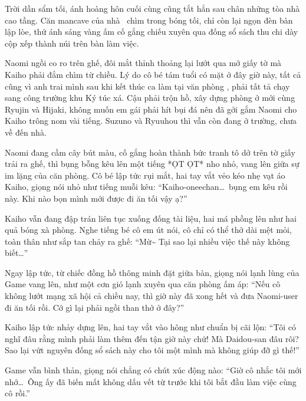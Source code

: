 \documentclass[../main.tex]{subfiles}
\begin{document}

Trời dần sẩm tối, ánh hoàng hôn cuối cùng cũng tắt hẳn sau chân những tòa nhà cao tầng. Căn mancave của nhà \hls\ chìm trong bóng tối, chỉ còn lại ngọn đèn bàn lập lòe, thứ ánh sáng vàng ấm cố gắng chiếu xuyên qua đống sổ sách thu chi dày cộp xếp thành núi trên bàn làm việc.

Naomi ngồi co ro trên ghế, đôi mắt thỉnh thoảng lại lướt qua mớ giấy tờ mà Kaiho phải đắm chìm từ chiều. Lý do cô bé tám tuổi có mặt ở đây giờ này, tất cả cũng vì anh trai mình sau khi kết thúc ca làm tại văn phòng \hll, phải tất tả chạy sang công trường khu Ký túc xá. Cậu phải trộn hồ, xây dựng phòng ở mới cùng Ryujin và Hijaki, không muốn em gái phải hít bụi đá nên đã gởi gắm Naomi cho Kaiho trông nom vài tiếng. Suzuno và Ryuuhou thì vẫn còn đang ở trường, chưa về đến nhà.

Naomi đang cầm cây bút màu, cố gắng hoàn thành bức tranh tô dở trên tờ giấy trải ra ghế, thì bụng bỗng kêu lên một tiếng *ỌT ỌT* nho nhỏ, vang lên giữa sự im lặng của căn phòng. Cô bé lập tức rụi mắt, hai tay vắt vẻo kéo nhẹ vạt áo Kaiho, giọng nói nhỏ như tiếng muỗi kêu: ``Kaiho-oneechan\dots\ bụng em kêu rồi này. Khi nào bọn mình mới được đi ăn tối vậy ạ?''

Kaiho vẫn đang đập trán liên tục xuống đống tài liệu, hai má phồng lên như hai quả bóng xà phòng. Nghe tiếng bé cô em út nói, cô chỉ có thể thở dài mệt mỏi, toàn thân như sắp tan chảy ra ghế: ``Mừ\~{} Tại sao lại nhiều việc thế này không biết\dots''

Ngay lập tức, từ chiếc đồng hồ thông minh đặt giữa bàn, giọng nói lạnh lùng của Game vang lên, như một cơn gió lạnh xuyên qua căn phòng ấm áp: ``Nếu cô không lướt mạng xã hội cả chiều nay, thì giờ này đã xong hết và đưa Naomi-user đi ăn tối rồi. Cớ gì lại phải ngồi than thở ở đây?''

Kaiho lập tức nhảy dựng lên, hai tay vắt vào hông như chuẩn bị cãi lộn: ``Tôi có nghĩ đâu rằng mình phải làm thêm đến tận giờ này chứ! Mà Daidou-san đâu rôi? Sao lại vứt nguyên đống sổ sách này cho tôi một mình mà không giúp đỡ gì thế!''

Game vẫn bình thản, giọng nói chẳng có chút xúc động nào: ``Giờ cô nhắc tôi mới nhớ\dots\ Ông ấy đã biến mất không dấu vết từ trước khi tôi bắt đầu làm việc cùng cô rồi.''
\end{document}
